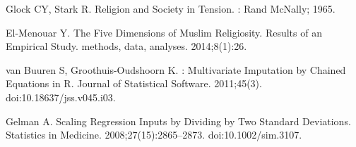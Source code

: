 \documentclass[10pt,letterpaper]{article}
\begin{document}
\begin{thebibliography}{10}
Glock CY, Stark R.
\newblock Religion and {{Society}} in {{Tension}}.
: {Rand McNally}; 1965.

{El-Menouar} Y.
\newblock The Five Dimensions of {{Muslim}} Religiosity. {{Results}} of an
  Empirical Study.
\newblock methods, data, analyses. 2014;8(1):26.

van Buuren S, {Groothuis-Oudshoorn} K.
 : {{Multivariate Imputation}} by {{Chained Equations}} in
  {{R}}.
\newblock Journal of Statistical Software. 2011;45(3).
\newblock doi:{10.18637/jss.v045.i03}.

Gelman A.
\newblock Scaling {{Regression Inputs}} by {{Dividing}} by {{Two Standard
  Deviations}}.
\newblock Statistics in Medicine. 2008;27(15):2865--2873.
\newblock doi:{10.1002/sim.3107}.

\end{thebibliography}

%
\end{document}

